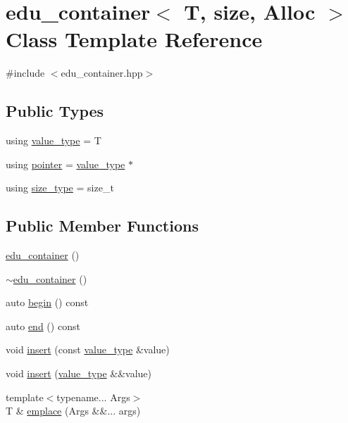 \hypertarget{classedu__container}{}\section{edu\+\_\+container$<$ T, size, Alloc $>$ Class Template Reference}
\label{classedu__container}


{\ttfamily \#include $<$edu\+\_\+container.\+hpp$>$}

\subsection*{Public Types}
\begin{DoxyCompactItemize}
\item 
using \hyperlink{classedu__container_a1a1a693013d3f6fd261d6e3532ec2a11}{value\+\_\+type} = T
\item 
using \hyperlink{classedu__container_a20f66877e7a564cb76a3f7d5a5f6ff59}{pointer} = \hyperlink{classedu__container_a1a1a693013d3f6fd261d6e3532ec2a11}{value\+\_\+type} $\ast$
\item 
using \hyperlink{classedu__container_a2a83d6329e026dd119b001b0e0d9c9f5}{size\+\_\+type} = size\+\_\+t
\end{DoxyCompactItemize}
\subsection*{Public Member Functions}
\begin{DoxyCompactItemize}
\item 
\hyperlink{classedu__container_a4facfaba4cbdd4b8845e05f7b29dfc46}{edu\+\_\+container} ()
\item 
\hyperlink{classedu__container_a350dad874b99e47a93b074a49841ccf1}{$\sim$edu\+\_\+container} ()
\item 
auto \hyperlink{classedu__container_a7b97b3fa13a5bb3357062687bd408f7b}{begin} () const
\item 
auto \hyperlink{classedu__container_aa32c0fa70c685557a5d35fe48a8fa1c2}{end} () const
\item 
void \hyperlink{classedu__container_ac104fcdf3c6c2684e53a05d715327f6f}{insert} (const \hyperlink{classedu__container_a1a1a693013d3f6fd261d6e3532ec2a11}{value\+\_\+type} \&value)
\item 
void \hyperlink{classedu__container_aa27f03449ca0e27ac7ae7a91b079afff}{insert} (\hyperlink{classedu__container_a1a1a693013d3f6fd261d6e3532ec2a11}{value\+\_\+type} \&\&value)
\item 
{\footnotesize template$<$typename... Args$>$ }\\T \& \hyperlink{classedu__container_a0c79c6d4ab2752c1edee74c591659eec}{emplace} (Args \&\&... args)
\end{DoxyCompactItemize}


